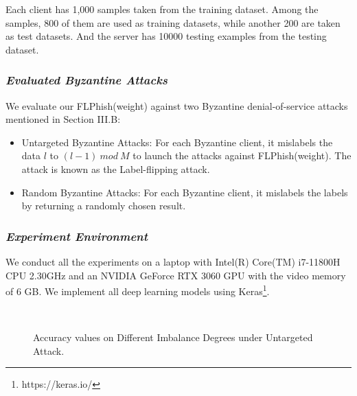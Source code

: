 \documentclass[journal]{IEEEtran}
\begin{document}
  \par Each client has 1,000 samples taken from the training dataset. Among the samples, 800 of them are used as training datasets, while another 200 are taken as test datasets. And the server has 10000 testing examples from the testing dataset. 
  \subsubsection{\textit{Evaluated Byzantine Attacks}} We evaluate our FLPhish(weight) against two Byzantine denial-of-service attacks mentioned in Section III.B:
  \begin{itemize}
    \item Untargeted Byzantine Attacks: For each Byzantine client, it mislabels the data $l$ to $(l-1)\ mod\ M$ to launch the attacks against FLPhish(weight). The attack is known as the Label-flipping attack. 
    \item Random Byzantine Attacks: For each Byzantine client, it mislabels the labels by returning a randomly chosen result.
    \end{itemize}

  
  \subsubsection{{\textit{Experiment Environment}}} We conduct all the experiments on a laptop with Intel(R) Core(TM) i7-11800H CPU 2.30GHz and an NVIDIA GeForce RTX 3060 GPU with the video memory of 6 GB. We implement all deep learning models using Keras\footnote{https://keras.io/}.



  \begin{figure}[!htp]
    \centering
    \\
    \caption{Accuracy values on Different Imbalance Degrees under Untargeted Attack.}
    \label{fig_table_imbalances_untargeted}
  \end{figure}
\end{document}
